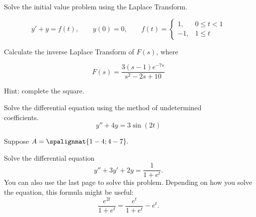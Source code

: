 \documentclass[12pt]{exam}
\begin{document}
\begin{questions}



    \newpage  	
 	
    \question[6] Solve the initial value problem using the Laplace Transform. 
    
    $$y' + y = f(t),  \qquad y(0) = 0, \qquad f(t) = \begin{cases} 1 ,& 0 \le t < 1  \\ -1, & 1 \leq t   \end{cases}  $$


    \newpage 

    \question[6] Calculate the inverse Laplace Transform of $F(s)$, where 

    $$ F(s) = \frac{3(s-1) e^{-7s}}{s^2 - 2s + 10}  $$
    
    Hint: complete the square. 
    
    \newpage 
    
    \question[8] Solve the differential equation using the method of undetermined \\coefficients. $$y'' + 4y = 3 \sin(2t)$$
    
   
    \newpage
    
    \question[10] Suppose $A =\spalignmat{1 -4;4 -7}.$  %
 	
    
    \newpage 

    \question[10] Solve the differential equation $$\displaystyle y'' + 3y' + 2y = \frac{1}{1+e^t}.$$
    You can also use the last page to solve this problem. Depending on how you solve the equation, this formula might be useful: $$\displaystyle \frac{e^{2t}}{1+e^t} = \frac{e^t}{1+e^t} - e^t.$$

    
\end{questions}
\end{document}
